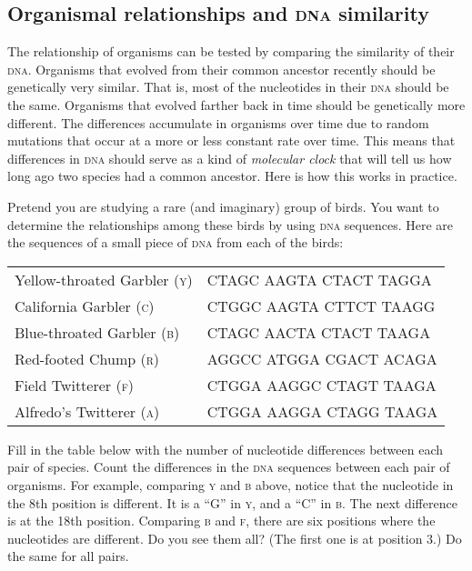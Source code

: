 \documentclass[12pt, hidelinks]{exam}
\newcommand{\dna}{\textsc{dna}}
\begin{document}
\subsection*{Organismal relationships and \textsc{dna} similarity}

The relationship of organisms can be tested by comparing the similarity of 
their \dna{}. Organisms that evolved from their common ancestor recently should 
be genetically very similar. That is, most of the nucleotides in their 
\dna{} should be the same.  Organisms that evolved farther back in time 
should be genetically more different. The differences accumulate 
in organisms over time due to random mutations that occur at a more or less 
constant rate over time. This means that 
differences in \textsc{dna} should serve as a kind of \emph{molecular clock} that 
will tell us how long ago two species had a common ancestor. Here is how this works in practice.

Pretend you are studying a rare (and imaginary) group
of birds. You want to determine the relationships among these
birds by using \textsc{dna} sequences. Here are the sequences of a small
piece of \textsc{dna} from each of the birds:

\begin{longtable}[c]{@{}ll@{}}
\toprule
Yellow-throated Garbler \textsc{(y)} & {\ttfamily CTAGC AAGTA CTACT TAGGA}\tabularnewline
California Garbler \textsc{(c)} & {\ttfamily CTGGC AAGTA CTTCT TAAGG}\tabularnewline
Blue-throated Garbler \textsc{(b)} & {\ttfamily CTAGC AACTA CTACT TAAGA}\tabularnewline
Red-footed Chump \textsc{(r)} & {\ttfamily AGGCC ATGGA CGACT ACAGA}\tabularnewline
Field Twitterer \textsc{(f)} & {\ttfamily CTGGA AAGGC CTAGT TAAGA}\tabularnewline
Alfredo's Twitterer \textsc{(a)} & {\ttfamily CTGGA AAGGA CTAGG TAAGA}\tabularnewline
\bottomrule
\end{longtable}

Fill in the table below with the number of nucleotide differences between
each pair of species. Count the differences in the \textsc{dna} sequences
between each pair of organisms.  For example, comparing \textsc{y} and \textsc{b} above, notice that the
nucleotide in the 8th position is different. It is a ``G'' in \textsc{y}, and a ``C''
in \textsc{b}. The next difference is at the 18th position. Comparing \textsc{b} and \textsc{f}, there are six positions
where the nucleotides are different. Do you see them all? (The first
one is at position 3.) Do the same for all pairs.
\end{document}
